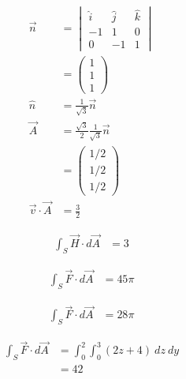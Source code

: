 \documentclass[10pt]{extarticle}
\begin{document}
\begin{problem}{19.1}
\begin{description}[font=\normalfont]
        \begin{align*}
          \vec{n} &= \begin{vmatrix}\hat{i} & \hat{j} & \hat{k} \\ -1 & 1 & 0 \\ 0 & -1 & 1\end{vmatrix}\\
                  &= \begin{pmatrix}1\\1\\1\end{pmatrix}\\
          \hat{n} &= \frac{1}{\sqrt{3}}\vec{n}\\
          \vec{A} &= \frac{\sqrt{3}}{2}\frac{1}{\sqrt{3}}\vec{n}\\
                  &= \begin{pmatrix}1/2\\1/2\\1/2\end{pmatrix}\\
          \vec{v} \cdot \vec{A} &= \frac{3}{2}
        \end{align*}
      \item[26:]
        \begin{align*}
          \int_{S}\vec{H}\cdot d\vec{A} &= 3
        \end{align*}
      \item[30:]
        \begin{align*}
          \int_{S} \vec{F} \cdot d\vec{A} &= 45\pi
        \end{align*}
      \item[40:]
        \begin{align*}
          \int_{S} \vec{F} \cdot d\vec{A} &= 28\pi
        \end{align*}
      \item[50:]
        \begin{align*}
          \int_{S} \vec{F} \cdot d\vec{A} &= \int_{0}^{2}\int_{0}^{3}\left(2z + 4\right)~dz~dy\\
                                          &= 42
        \end{align*}
    \end{description}
  \end{problem}
\end{document}
